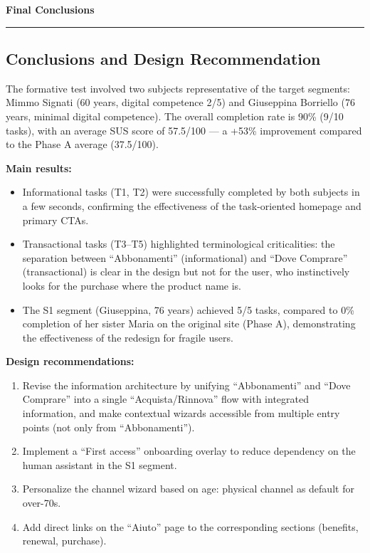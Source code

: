 ﻿\documentclass[11pt,a4paper]{article}
\begin{document}

\newpage
\begin{center}
  {\color{primaryColor}\large\bfseries Final Conclusions}
  \vspace{0.1cm}
  \color{borderColor}\hrule
\end{center}

\vspace{0.2cm}

\subsection*{Conclusions and Design Recommendation}
\begin{tcolorbox}[base]
The formative test involved two subjects representative of the target
segments: Mimmo Signati (60 years, digital competence 2/5) and Giuseppina
Borriello (76 years, minimal digital competence). The overall completion rate
is 90\% (9/10 tasks), with an average SUS score of
57.5/100 --- a +53\% improvement compared to the Phase A average
(37.5/100).

\medskip

\noindent\textbf{Main results:}
\begin{itemize}[leftmargin=*]
  \item Informational tasks (T1, T2) were successfully completed by
  both subjects in a few seconds, confirming the effectiveness of the
  task-oriented homepage and primary CTAs.
  \item Transactional tasks (T3--T5) highlighted terminological
  criticalities: the separation between ``Abbonamenti'' (informational) and
  ``Dove Comprare'' (transactional) is clear in the design but not for
  the user, who instinctively looks for the purchase where the product name
  is.
  \item The S1 segment (Giuseppina, 76 years) achieved 5/5 tasks,
  compared to 0\% completion of her sister Maria on the original site
  (Phase A), demonstrating the effectiveness of the redesign for fragile users.
\end{itemize}

\medskip

\noindent\textbf{Design recommendations:}
\begin{enumerate}[leftmargin=*]
  \item Revise the information architecture by unifying ``Abbonamenti''
  and ``Dove Comprare'' into a single ``Acquista/Rinnova'' flow with
  integrated information, and make contextual wizards accessible
  from multiple entry points (not only from ``Abbonamenti'').
  \item Implement a ``First access'' onboarding overlay to
  reduce dependency on the human assistant in the S1 segment.
  \item Personalize the channel wizard based on age: physical channel
  as default for over-70s.
  \item Add direct links on the ``Aiuto'' page to the corresponding
  sections (benefits, renewal, purchase).
\end{enumerate}
\end{tcolorbox}
\end{document}
